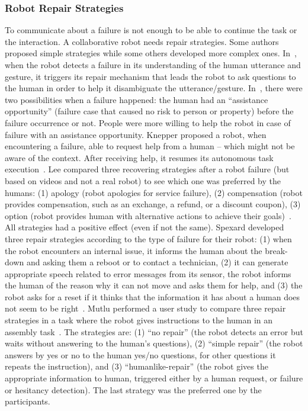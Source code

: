 \documentclass[a4paper,11pt,twoside]{StyleThese}
\begin{document}
\subsubsection{Robot Repair Strategies}
To communicate about a failure is not enough to be able to continue the task or the interaction. A collaborative robot needs repair strategies. Some authors proposed simple strategies while some others developed more complex ones. In~\cite{li_2006_computational}, when the robot detects a failure in its understanding of the human utterance and gesture, it triggers its repair mechanism that leads the robot to ask questions to the human in order to help it disambiguate the utterance/gesture. In~\cite{morales_2019_interaction}, there were two possibilities when a failure happened: the human had an ``assistance opportunity'' (\ie failure case that caused no risk to person or property) before the failure occurrence or not. People were more willing to help the robot in case of failure with an assistance opportunity. Knepper \etal{} proposed a robot, when encountering a failure, able to request help from a human -- which might not be aware of the context. After receiving help, it resumes its autonomous task execution~\cite{knepper_2015_recovering}. Lee \etal{} compared three recovering strategies after a robot failure (but based on videos and not a real robot) to see which one was preferred by the humans: (1) apology (\ie robot apologies for service failure), (2) compensation (\ie robot provides compensation, such as an exchange, a refund, or a discount coupon), (3) option (\ie robot provides human with alternative actions to achieve their goals)~\cite{lee_2010_gracefully}. All strategies had a positive effect (even if not the same). Spexard \etal{} developed three repair strategies according to the type of failure for their robot: (1) when the robot encounters an internal issue, it informs the human about the break-down and asking them a reboot or to contact a technician, (2) it can generate appropriate speech related to error messages from its sensor, \eg the robot informs the human of the reason why it can not move and asks them for help, and (3) the robot asks for a reset if it thinks that the information it has about a human does not seem to be right~\cite{spexard_2008_oops}. Mutlu \etal{} performed a user study to compare three repair strategies in a task where the robot gives instructions to the human in an assembly task~\cite{mutlu_2013_coordination}. The strategies are: (1) ``no repair'' (\ie the robot detects an error but waits without answering to the human's questions), (2) ``simple repair'' (\ie the robot answers by yes or no to the human yes/no questions, for other questions it repeats the instruction), and (3) ``humanlike-repair'' (\ie the robot gives the appropriate information to human, triggered either by a human request, or failure or hesitancy detection). The last strategy was the preferred one by the participants.

\ifdefined{}
\else


\end{document}

